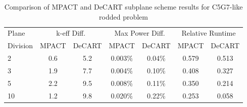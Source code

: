 {\begin{table}
\caption{Comparison of MPACT and DeCART subplane scheme results for C5G7-like rodded problem}
\begin{center}
\begin{tabular}{|l|c|c|c|c|c|c|}\hline
Plane & \multicolumn{2}{|c|}{k-eff Diff.} & \multicolumn{2}{|c|}{Max Power Diff.} & \multicolumn{2}{|c|}{Relative Runtime} \\ \cline{2-7}
Division & MPACT & DeCART & MPACT & DeCART & MPACT & DeCART \\ \hline
2 & 0.6 & 5.2 & 0.003\% & 0.04\% & 0.579 & 0.513 \\ \hline
3 & 1.9 & 7.7 & 0.004\% & 0.10\% & 0.408 & 0.327 \\ \hline
5 & 2.2 & 9.5 & 0.008\% & 0.11\% & 0.350 & 0.214 \\ \hline
10 & 1.2 & 9.8 & 0.020\% & 0.22\% & 0.253 & 0.058 \\ \hline
\end{tabular}
\end{center}
\end{table}

\begin{table}
\caption{Comparison of subplane scheme to traditional 2D/1D for VERA Progression Problem 4}
\begin{center}
\end{center}
\end{table}

}
